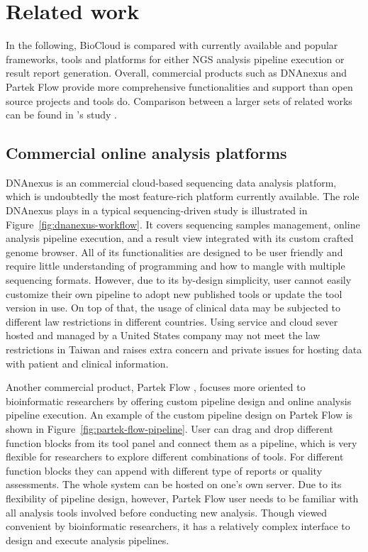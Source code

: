 \chapter{Related work}
\label{c:related-work}

In the following, BioCloud is compared with currently available and popular
frameworks, tools and platforms for either NGS analysis pipeline execution or
result report generation. Overall, commercial products such as DNAnexus and
Partek Flow provide more comprehensive functionalities and support than open
source projects and tools do. Comparison between a larger sets of related works
can be found in \citeauthor{leipzig2016:review}'s study
\cite{leipzig2016:review}.


\section{Commercial online analysis platforms}

DNAnexus \cite{:dnanexus} is an commercial cloud-based sequencing data analysis
platform, which is undoubtedly the most feature-rich platform currently
available. The role DNAnexus plays in a typical sequencing-driven study is
illustrated in Figure~\ref{fig:dnanexus-workflow}. It covers sequencing samples
management, online analysis pipeline execution, and a result view integrated
with its custom crafted genome browser. All of its functionalities are designed
to be user friendly and require little understanding of programming and how to
mangle with multiple sequencing formats. However, due to its by-design
simplicity, user cannot easily customize their own pipeline to adopt new
published tools or update the tool version in use. On top of that, the usage of
clinical data may be subjected to different law restrictions in different
countries. Using service and cloud sever hosted and managed by a United States
company may not meet the law restrictions in Taiwan and raises extra concern
and private issues for hosting data with patient and clinical information.



Another commercial product, Partek Flow \cite{:partek}, focuses more oriented
to bioinformatic researchers by offering custom pipeline design and online
analysis pipeline execution. An example of the custom pipeline design on Partek
Flow is shown in Figure~\ref{fig:partek-flow-pipeline}. User can drag and drop
different function blocks from its tool panel and connect them as a pipeline,
which is very flexible for researchers to explore different combinations of
tools. For different function blocks they can append with different type of
reports or quality assessments. The whole system can be hosted on one's own
server. Due to its flexibility of pipeline design, however, Partek Flow user
needs to be familiar with all analysis tools involved before conducting new
analysis. Though viewed convenient by bioinformatic researchers, it has a
relatively complex interface to design and execute analysis pipelines.


